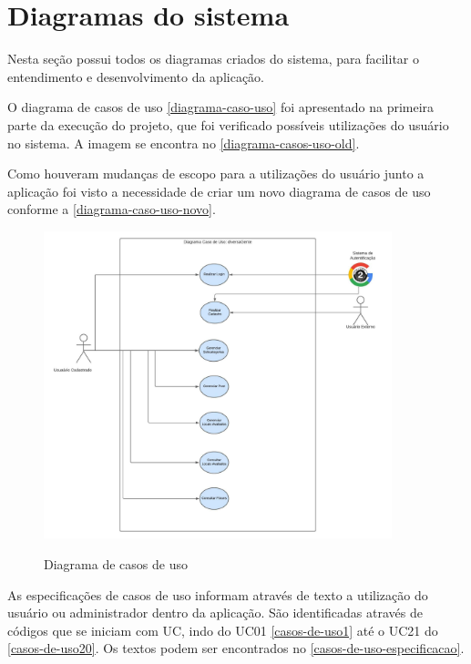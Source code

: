 
\section{Diagramas do sistema}

Nesta seção possui todos os diagramas criados do sistema, para facilitar o entendimento e desenvolvimento da aplicação. 

O diagrama de casos de uso  \autoref{diagrama-caso-uso} foi apresentado na primeira parte da execução do projeto, que foi verificado possíveis utilizações do usuário no sistema. A imagem se encontra no \autoref{diagrama-casos-uso-old}.

Como houveram mudanças de escopo para a utilizações do usuário junto a aplicação foi visto a necessidade de criar um novo diagrama de casos de uso conforme a \autoref{diagrama-caso-uso-novo}.



\pagebreak

\begin{figure}[htb]
	\centering
	\caption{\label{fig_arq_virado}Diagrama de casos de uso}
	\includegraphics[width=0.90\textwidth]{anexos/novocasodeusoemoutroformato.jpeg}
	\label{diagrama-caso-uso-novo}
\end{figure}



As especificações de casos de uso informam através de texto a utilização do usuário ou administrador dentro da aplicação. São identificadas através de códigos que se iniciam com UC, indo do
UC01 \autoref{casos-de-uso1} até o UC21 do \autoref{casos-de-uso20}. Os textos podem ser encontrados no \autoref{casos-de-uso-especificacao}.

